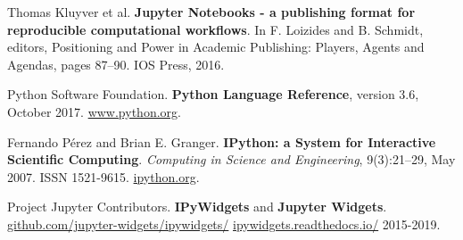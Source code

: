 \documentclass[runningheads]{llncs}
\begin{document}
%
%
% 
% 
%
\begin{thebibliography}{8}
    Thomas Kluyver et al.
    \textbf{Jupyter Notebooks - a publishing format for reproducible computational workflows}.
    In F. Loizides and B. Schmidt, editors, Positioning and Power in Academic Publishing: Players, Agents and Agendas, pages 87–90. IOS Press, 2016.

    Python Software Foundation.
    \textbf{Python Language Reference}, version 3.6, October 2017. \url{www.python.org}.

    Fernando Pérez and Brian E. Granger.
    \textbf{IPython: a System for Interactive Scientific Computing}.
    \emph{Computing in Science and Engineering}, 9(3):21–29, May 2007. ISSN 1521-9615. \url{ipython.org}.

    Project Jupyter Contributors.
    \textbf{IPyWidgets} and \textbf{Jupyter Widgets}.
    \url{github.com/jupyter-widgets/ipywidgets/}
    \url{ipywidgets.readthedocs.io/}
    2015-2019.
\end{thebibliography}
\end{document}
